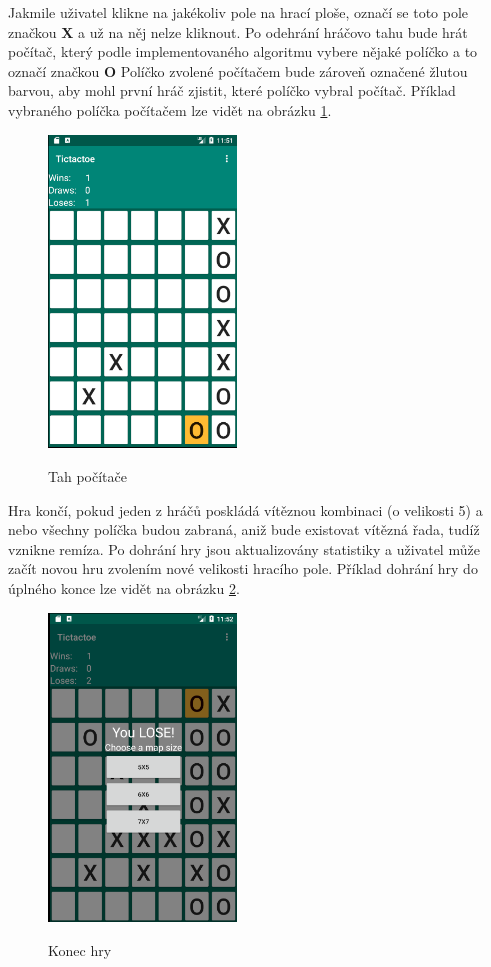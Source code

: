 \documentclass[12pt, a4paper]{article}
\begin{document}
\par
Jakmile uživatel klikne na jakékoliv pole na hrací ploše, označí se toto pole značkou \textbf{X} a už na něj nelze kliknout. Po odehrání hráčovo tahu bude hrát počítač, který podle implementovaného algoritmu vybere nějaké políčko a to označí značkou \textbf{O} Políčko zvolené počítačem bude zároveň označené žlutou barvou, aby mohl první hráč zjistit, které políčko vybral počítač. Příklad vybraného políčka počítačem lze vidět na obrázku \ref{fig:move}.
	\begin{figure}[h!]
	\centering
	\includegraphics[width=5cm]{img/highlighted}\\
	\caption{Tah počítače}
	\label{fig:move}
	\end{figure}
\par
Hra končí, pokud jeden z hráčů poskládá vítěznou kombinaci (o velikosti 5) a nebo všechny políčka budou zabraná, aniž bude existovat vítězná řada, tudíž vznikne remíza. Po dohrání hry jsou aktualizovány statistiky a uživatel může začít novou hru zvolením nové velikosti hracího pole. Příklad dohrání hry do úplného konce lze vidět na obrázku \ref{fig:endgame}.
	\begin{figure}[h!]
	\centering
	\includegraphics[width=5cm]{img/endgame}\\
	\caption{Konec hry}
	\label{fig:endgame}
	\end{figure}
\newpage
\end{document}
